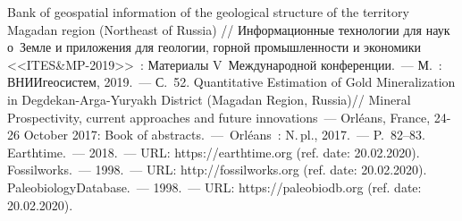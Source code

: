 \begin{thebibliography}{99}
\bibitem{} Bank of geospatial information of the geological structure of the territory Magadan region (Northeast of Russia) // Информационные технологии для наук о~Земле и приложения для геологии, горной промышленности и экономики <<ITES\&MP-2019>>~: Материалы V~Международной конференции.~--- М.~: ВНИИгеосистем, 2019.~--- С.~52.
\bibitem{} Quantitative Estimation of Gold Mineralization in Degdekan-Arga-Yuryakh District (Magadan Region, Russia)// Mineral Prospectivity, current approaches and future innovations~--- Orléans, France, 24-26 October 2017: Book of abstracts.~--- Orléans~: N.\,pl., 2017.~--- P.~82--83.
\bibitem{}Earthtime.~--- 2018.~--- URL: https://earthtime.org  (ref. date: 20.02.2020).
\bibitem{}Fossilworks.~--- 1998.~--- URL: http://fossilworks.org  (ref. date: 20.02.2020).
\bibitem{}PaleobiologyDatabase.~--- 1998.~--- URL: https://paleobiodb.org  (ref. date: 20.02.2020).

\end{thebibliography}
